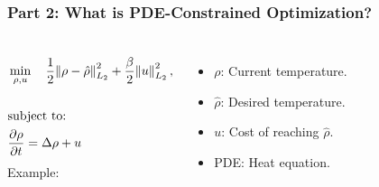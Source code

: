 \documentclass[aspectratio=169,xcolor=dvipsnames]{beamer}
\begin{document}
\begin{frame}
\frametitle{Part 2: What is PDE-Constrained Optimization? }
\begin{columns}
\begin{align*}
&\min_{\rho,u} \quad \frac{1}{2}\norm{\rho- \hat{\rho}}_{L_2}^2 + \frac{\beta}{2} \norm{u}_{L_2}^2,\\
\\
&\text{subject to:}
\\
& \frac{\partial \rho}{\partial t}= \Delta \rho + u 
\end{align*}
Example:
\begin{itemize}
	\item $\rho$: Current temperature.
	\item $\hat \rho$: Desired temperature.
	\item $u$: Cost of reaching $\hat \rho$.
	\item PDE: Heat equation.
\end{itemize}
	
\end{columns}
\end{frame}
\end{document}
